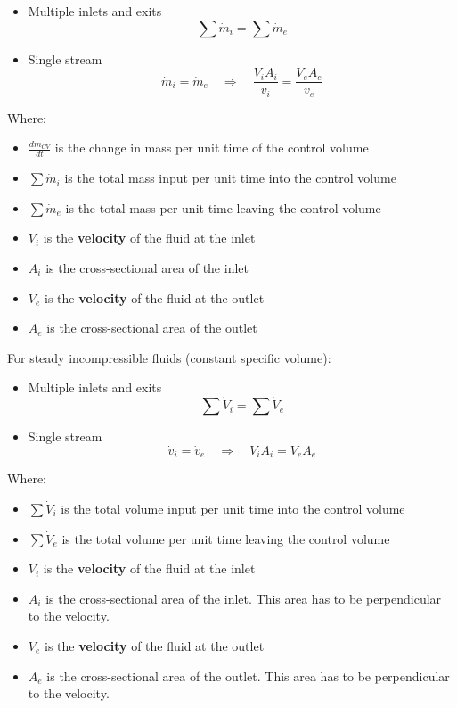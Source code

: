 \documentclass[11pt]{article}
\begin{document}
\begin{itemize}
\item Multiple inlets and exits
\[\sum \dot{m}_i = \sum \dot{m}_e\]

\item Single stream
\[\dot{m}_i = \dot{m}_e \quad \Rightarrow \quad \frac{V_i A_i}{v_i} = \frac{V_e A_e}{v_e}\]
\end{itemize}

Where:
\begin{itemize}
\item \(\frac{dm_{CV}}{dt}\) is the change in mass per unit time of the control volume
\item \(\sum \dot{m}_i\) is the total mass input per unit time into the control volume
\item \(\sum \dot{m}_e\) is the total mass per unit time leaving the control volume
\item \(V_i\) is the \textbf{velocity} of the fluid at the inlet
\item \(A_i\) is the cross-sectional area of the inlet
\item \(V_e\) is the \textbf{velocity} of the fluid at the outlet
\item \(A_e\) is the cross-sectional area of the outlet
\end{itemize}

\newpage

For steady incompressible fluids (constant specific volume):

\begin{itemize}
\item Multiple inlets and exits
\[\sum \dot{V}_i = \sum \dot{V}_e\]

\item Single stream
\[\dot{v}_i = \dot{v}_e \quad \Rightarrow \quad V_i A_i = V_e A_e\]
\end{itemize}

Where:
\begin{itemize}
\item \(\sum \dot{V}_i\) is the total volume input per unit time into the control volume
\item \(\sum \dot{V}_e\) is the total volume per unit time leaving the control volume
\item \(V_i\) is the \textbf{velocity} of the fluid at the inlet
\item \(A_i\) is the cross-sectional area of the inlet. This area has to be perpendicular to the velocity.
\item \(V_e\) is the \textbf{velocity} of the fluid at the outlet
\item \(A_e\) is the cross-sectional area of the outlet. This area has to be perpendicular to the velocity.
\end{itemize}
\end{document}
